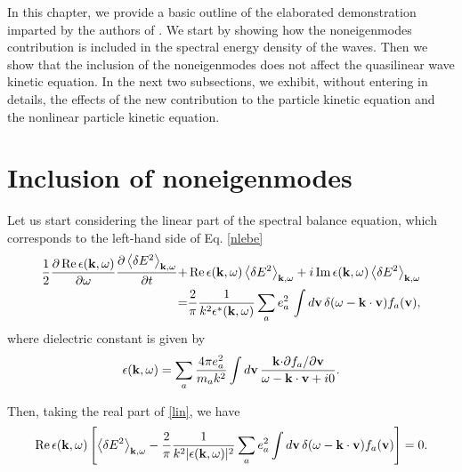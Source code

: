 \documentclass[12pt,a4paper,ruledheader]{report}
\begin{document}
In this chapter, we provide a basic outline of the elaborated demonstration
imparted by the authors of \cite{YZKS16}. We start by showing how the
noneigenmodes contribution is included in the spectral energy density of the
waves. Then we show that the inclusion of the noneigenmodes does not affect
the quasilinear wave kinetic equation. In the next two subsections, we
exhibit, without entering in details, the effects of the new contribution
to the particle kinetic equation and the nonlinear particle kinetic equation.



\section{Inclusion of noneigenmodes}
Let us start considering the linear part of the spectral balance equation,
which corresponds to the left-hand side of Eq. \eqref{nlebe}
\begin{equation}
  \label{lin}
  \begin{split}
  \frac{1}{2}\frac{\partial \,\mbox{Re}\,\epsilon({\bf k},\omega)}{\partial \omega}
  \frac{\partial \left< \delta E^2 \right>_{{\bf k},\omega}}{\partial t}
  +&\,\mbox{Re}\,\epsilon({\bf k},\omega)
  \left< \delta E^2 \right>_{{\bf k},\omega}
  +i\, \mbox{Im}\,\epsilon({\bf k},\omega)
  \left< \delta E^2 \right>_{{\bf k},\omega}\\
  =&\frac{2}{\pi}\frac{1}{k^2\epsilon^{*}({\bf k},\omega)}
  \sum_a e^2_a\, \int d{\bf v}\,\delta(\omega-{\bf k \cdot v})f_a({\bf v}),
\end{split}
\end{equation}
where dielectric constant is given by
\begin{equation}
  \label{dielec}
  \epsilon({\bf k},\omega)=\sum_a \frac{4\pi e^2_a}{m_ak^2}\int d{\bf v}\,
  \frac{{\bf k \cdot}\partial f_a/\partial{\bf v}}{\omega-{\bf k \cdot v}+i0}.
\end{equation}

Then, taking the real part of \eqref{lin}, we have
\begin{equation}
  \label{real}
  \mbox{Re}\, \epsilon({\bf k},\omega)\left[
  \left\langle \delta E^2 \right\rangle_{{\bf k},\omega}
  -\frac{2}{\pi}\frac{1}{k^2|\epsilon({\bf k},\omega)|^2}
  \sum_a e_a^2 \int d{\bf v}\, \delta(\omega-{\bf k \cdot v})
  f_a({\bf v})\right]=0.
\end{equation}
\end{document}
